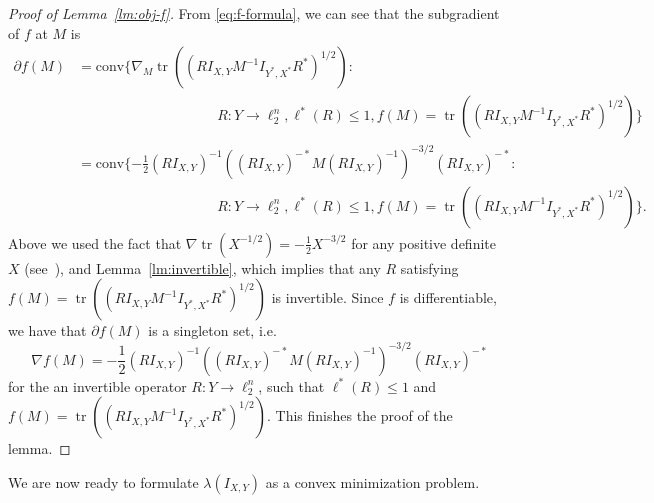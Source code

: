 \documentclass[12pt]{article}
\DeclareMathOperator{\tr}{tr}
\begin{document}
\begin{proof}[Proof of Lemma~\ref{lm:obj-f}]
  From \eqref{eq:f-formula}, we can see that the subgradient of
  $f$ at $M$ is
  \begin{align*}
  \partial f(M) &= \mathrm{conv}
  \{\nabla_M \tr((RI_{X,Y}M^{-1}I_{Y^*,X^*}R^*)^{1/2}):\\
  &\hspace{10em}
  R: Y \to \ell_2^n, \ell^*(R) \le 1,
  f(M) = \tr((RI_{X,Y}M^{-1}I_{Y^*,X^*}R^*)^{1/2})\}\\
  &= 
  \mathrm{conv}\{
  -\frac{1}{2} 
  (RI_{X,Y})^{-1} ((RI_{X,Y})^{-*} M (RI_{X,Y})^{-1})^{-3/2} (RI_{X,Y})^{-*}:\\ 
  &\hspace{10em}
  R: Y \to \ell_2^n, \ell^*(R) \le 1, 
  f(M) = \tr((RI_{X,Y}M^{-1}I_{Y^*,X^*}R^*)^{1/2})\}.
  \end{align*}
  Above we used the fact that $\nabla \tr(X^{-1/2}) =
  -\frac{1}{2}X^{-3/2}$ for any positive definite $X$
  (see~\cite{Lewis95}), and Lemma~\ref{lm:invertible}, which implies
  that any $R$ satisfying $f(M) =
  \tr((RI_{X,Y}M^{-1}I_{Y^*,X^*}R^*)^{1/2})$ is invertible. Since $f$
  is differentiable, we have that $\partial f(M)$ is a singleton set,
  i.e.~
  \[
  \nabla f(M) = 
  -\frac{1}{2} (RI_{X,Y})^{-1} ((RI_{X,Y})^{-*} M (RI_{X,Y})^{-1})^{-3/2} (RI_{X,Y})^{-*}
  \]
  for the an invertible operator $R: Y \to \ell_2^n$, such that
  $\ell^*(R) \le 1$ and $f(M) =
  \tr((RI_{X,Y}M^{-1}I_{Y^*,X^*}R^*)^{1/2})$. This finishes the proof
  of the lemma.
\end{proof}

We are now ready to formulate $\lambda(I_{X,Y})$ as a convex
minimization problem. 
\end{document}
